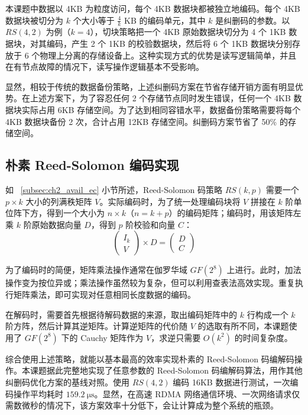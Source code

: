 本课题中数据以 4KB 为粒度访问，每个 4KB 数据块都被独立地编码。每个 4KB 数据块被切分为 $k$ 个大小等于 $\frac{4}{k}$ KB 的编码单元，其中 $k$ 是纠删码的参数。以 $RS(4, 2)$ 为例（$k = 4$），切块策略把一个 4KB 原始数据块切分为 4 个 1KB 数据块，对其编码，产生 2 个 1KB 的校验数据块，然后将 6 个 1KB 数据块分别存放于 6 个物理上分离的存储设备上。这种实现方式的优势是读写逻辑简单，并且在有节点故障的情况下，读写操作逻辑基本不受影响。

显然，相较于传统的数据备份策略，上述纠删码方案在节省存储开销方面有明显优势。在上述方案下，为了容忍任何 2 个存储节点同时发生错误，任何一个 4KB 数据块实际占用 6KB 存储空间。为了达到相同容错水平，数据备份策略需要将每个 4KB 数据块备份 2 次，合计占用 12KB 存储空间。纠删码方案节省了 50\% 的存储空间。

\subsection{朴素 Reed-Solomon 编码实现}
\label{subsec:}

如 ~\ref{subsec:ch2_avail_ec} 小节所述，Reed-Solomon 码策略 $RS(k, p)$ 需要一个 $p \times k$ 大小的列满秩矩阵 $V$。实际编码时，为了统一处理编码块将 $V$ 拼接在 $k$ 阶单位阵下方，得到一个大小为 $n \times k$（$n = k + p$）的编码矩阵；编码时，用该矩阵左乘 $k$ 阶原始数据向量 $D$，得到 $p$ 阶校验和向量 $C$：
\begin{equation}
    \left(
        \begin{array}{c}
            I_{k} \\
            V
        \end{array}
    \right)
    \times
    D
    =
    \left(
        \begin{array}{c}
            D \\
            C
        \end{array}
    \right)
\end{equation}

为了编码时的简便，矩阵乘法操作通常在伽罗华域 $GF(2^8)$ 上进行。此时，加法操作变为按位异或；乘法操作虽然较为复杂，但可以利用查表法高效实现。重复执行矩阵乘法，即可实现对任意相同长度数据的编码。

在解码时，需要首先根据待解码数据的来源，取出编码矩阵中的 $k$ 行构成一个 $k$ 阶方阵，然后计算其逆矩阵。计算逆矩阵的代价随 $V$ 的选取有所不同，本课题使用了 $GF(2^8)$ 下的 Cauchy 矩阵作为 $V$，求逆只需要 $O(k^2)$ 的时间复杂度。

综合使用上述策略，就能以基本最高的效率实现朴素的 Reed-Solomon 码编解码操作。本课题据此完整地实现了任意参数的 Reed-Solomon 码编解码算法，用作其他纠删码优化方案的基线对照。使用 $RS(4, 2)$ 编码 16KB 数据进行测试，一次编码操作平均耗时 $\SI{159.2}{\us}$。显然，在高速 RDMA 网络通信环境、一次网络请求仅需数微秒的情况下，该方案效率十分低下，会让计算成为整个系统的瓶颈。

